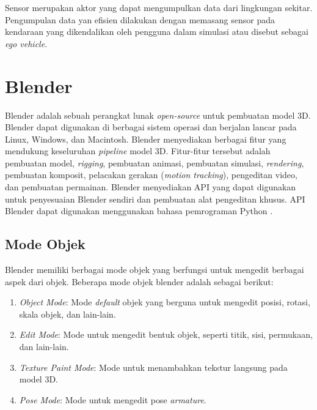 
Sensor merupakan aktor yang dapat mengumpulkan data dari lingkungan sekitar.
Pengumpulan data yan efisien dilakukan dengan memasang sensor pada kendaraan
yang dikendalikan oleh pengguna dalam simulasi atau disebut sebagai \textit{ego
vehicle}.



\section{Blender \parencite{blender-manual}}

Blender adalah sebuah perangkat lunak \textit{open-source} untuk pembuatan model
3D. Blender dapat digunakan di berbagai sistem operasi dan berjalan lancar pada
Linux, Windows, dan Macintosh. Blender menyediakan berbagai fitur yang mendukung
keseluruhan \textit{pipeline} model 3D. Fitur-fitur tersebut adalah pembuatan
model, \textit{rigging}, pembuatan animasi, pembuatan simulasi,
\textit{rendering}, pembuatan komposit, pelacakan gerakan (\textit{motion
tracking}), pengeditan video, dan pembuatan permainan. Blender menyediakan API
yang dapat digunakan untuk penyesuaian Blender sendiri dan pembuatan alat
pengeditan khusus. API Blender dapat digunakan menggunakan bahasa pemrograman
Python \parencite{blender-about}.

\subsection{Mode Objek}

Blender memiliki berbagai mode objek yang berfungsi untuk mengedit berbagai
aspek dari objek. Beberapa mode objek blender adalah sebagai berikut:

\begin{enumerate}

    \item \textit{Object Mode}: Mode \textit{default} objek yang berguna untuk
    mengedit posisi, rotasi, skala objek, dan lain-lain.

    \item \textit{Edit Mode}: Mode untuk mengedit bentuk objek, seperti titik,
    sisi, permukaan, dan lain-lain.

    \item \textit{Texture Paint Mode}: Mode untuk menambahkan tekstur langsung
    pada model 3D.

    \item \textit{Pose Mode}: Mode untuk mengedit pose \textit{armature}.

\end{enumerate}

